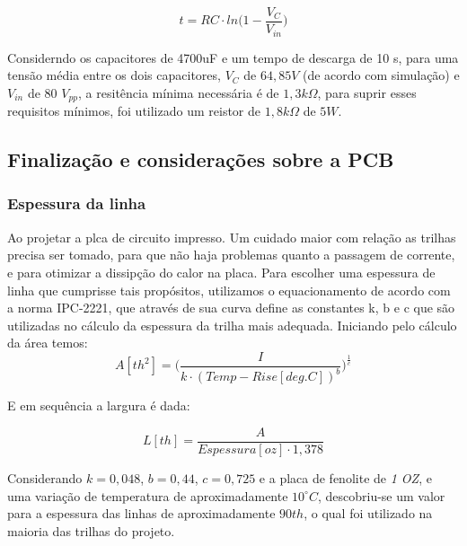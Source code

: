 \documentclass[a4paper,12pt,oneside,openany,table,xcdraw]{article}
\begin{document}
\begin{equation}
t= RC \cdot ln\bigg( 1 - \frac{V_{C}}{V_{in}} \bigg) 
\end{equation}

Considerndo os capacitores de 4700uF e um tempo de descarga de 10 s, para uma tensão média entre os dois capacitores, $V_{C}$ de $64,85 V$ (de acordo com simulação) e $V_{in}$ de 80 $V_{pp}$, a resitência mínima necessária é de $1,3 k\Omega$, para suprir esses requisitos mínimos, foi utilizado um reistor de $1,8 k\Omega$ de $5W$. 


\subsection{Finalização e considerações sobre a PCB}

\subsubsection{Espessura da linha}
Ao projetar a plca de circuito impresso. Um cuidado maior com relação as trilhas precisa ser tomado, para que não haja problemas quanto a passagem de corrente, e para otimizar a dissipção do calor na placa. 
Para escolher uma espessura de linha que cumprisse tais propósitos, utilizamos o equacionamento de acordo com a norma IPC-2221, que através de sua curva define as constantes k, b e c que são utilizadas no cálculo da espessura da trilha mais adequada.
Iniciando pelo cálculo da área temos:
\begin{equation}
A [\mathit{th^{2}}] = \Bigg(\dfrac{I}{k \cdot (Temp-Rise [deg. C])^{b}}\Bigg)^{\frac{1}{c}}
 \end{equation}
 \vspace{0.3cm}

E em sequência a largura é dada:

\begin{equation}
L [\mathit{th}] = \dfrac{A}{Espessura [oz] \cdot 1,378}
 \end{equation}
\vspace{0.3cm}

Considerando  $k = 0,048$, $b = 0,44$, $c = 0,725$ e a placa de fenolite de \emph{1 OZ}, e uma variação de temperatura de aproximadamente $10^{\circ}C$, descobriu-se um valor para a espessura das linhas de aproximadamente $90 th$, o qual foi utilizado na maioria das trilhas do projeto.
\end{document}
